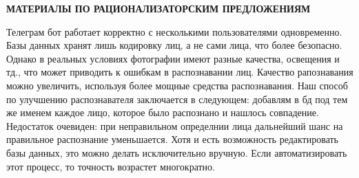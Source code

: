 \begin{center}
\bfseries{\large МАТЕРИАЛЫ ПО РАЦИОНАЛИЗАТОРСКИМ ПРЕДЛОЖЕНИЯМ}
\end{center}
Телеграм бот работает корректно с несколькими пользователями одновременно. Базы данных хранят лишь кодировку лиц, а не сами лица, что более безопасно. Однако в реальных условиях фотографии имеют разные качества, освещения и тд., что может приводить к ошибкам в распознавании лиц. Качество рапознавания можно увеличить, используя более мощные средства распознавания. Наш способ по улучшению распознавателя заключается в следующем: добавлям в бд под тем же именем каждое лицо, которое было распознано и нашлось совпадение. Недостаток очевиден: при неправильном определнии лица дальнейший шанс на правильное распознание уменьшается. Хотя и есть возможность редактировать базы данных, это можно делать исключительно вручную. Если автоматизировать этот процесс, то точность возрастет многократно.  
\pagebreak

